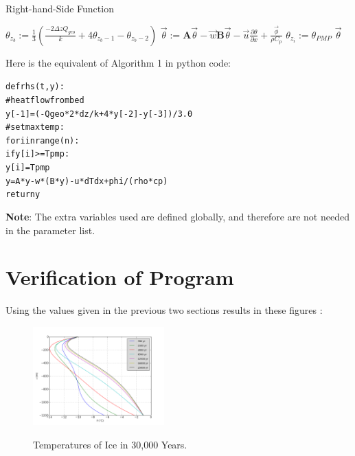 \documentclass{article}%
\begin{document}
\begin{algorithm}
  \caption{Right-hand-Side Function}
  \begin{algorithmic} 
    \STATE $\theta_{z_b} := \frac 13 \left( \frac{-2\Delta z Q_{geo}}{k} 
      + 4\theta_{z_b-1} - \theta_{z_b-2}\right)$
    \STATE $\vec \theta := \mathbf{A}\vec \theta - 
      \vec w \mathbf{B}\vec \theta - 
      \vec u \frac{\partial \theta}{\partial x} + 
      \frac{\vec \phi}{\rho C_p}$
        \STATE $\theta_{z_i} := \theta_{PMP}$
      \ENDIF
    \ENDFOR
    \RETURN $\vec \theta$
  \end{algorithmic}
\end{algorithm}

\newpage
\noindent Here is the equivalent of Algorithm 1 in python code:
\footnotesize
\begin{alltt}
def rhs(t, y):
  # heat flow from bed
  y[-1] = (-Qgeo*2*dz/k + 4*y[-2] - y[-3])/3.0
  # set max temp :
  for i in range(n):
    if y[i] >= Tpmp :
      y[i] = Tpmp
  y = A*y - w*(B * y) - u*dTdx + phi/(rho * cp)
  return y
\end{alltt}
\normalsize
\noindent \textbf{Note}: The extra variables used are defined globally, and therefore are not needed in the parameter list.


\section{Verification of Program}
Using the values given in the previous two sections results in these figures :

\begin{figure}[H]
	\centering
		\includegraphics[width=0.45\textwidth]{images/30000yr_converge.png}
	\label{fig:orbits}
	\caption{Temperatures of Ice in 30,000 Years.}
\end{figure}
\end{document}
